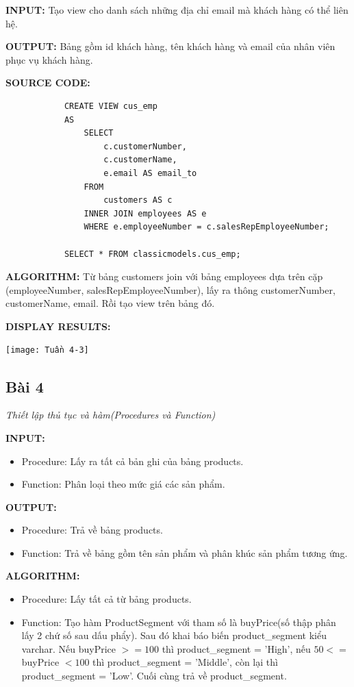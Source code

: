 \documentclass[12pt,a4paper]{report}
\begin{document}
	{\bf INPUT:} Tạo view cho danh sách những địa chỉ email mà khách hàng có thể liên hệ.
	
	{\bf OUTPUT:} Bảng gồm id khách hàng, tên khách hàng và email của nhân viên phục vụ khách hàng.
	
	{\bf SOURCE CODE:}
		\begin{lstlisting}
			CREATE VIEW cus_emp
			AS
				SELECT
					c.customerNumber,
					c.customerName,
					e.email AS email_to
				FROM 
					customers AS c
				INNER JOIN employees AS e
    			WHERE e.employeeNumber = c.salesRepEmployeeNumber;
    
			SELECT * FROM classicmodels.cus_emp;
		\end{lstlisting}
		
	{\bf ALGORITHM:} Từ bảng customers join với bảng employees dựa trên cặp (employeeNumber, salesRepEmployeeNumber), lấy ra thông customerNumber, customerName, email. Rồi tạo view trên bảng đó.
		
	{\bf DISPLAY RESULTS:}
		\begin{center}
			\texttt{[image: Tuần 4-3]}
		\end{center}			
	
\subsection{Bài 4}
	\begin{center}
		{\it Thiết lập thủ tục và hàm(Procedures và Function)}
	\end{center}
	
	{\bf INPUT:}
		\begin{itemize}
			\item Procedure: Lấy ra tất cả bản ghi của bảng products.
			\item Function:	Phân loại theo mức giá các sản phẩm.
		\end{itemize}

	{\bf OUTPUT:}
		\begin{itemize}
			\item Procedure: Trả về bảng products.
			\item Function: Trả về bảng gồm tên sản phẩm và phân khúc sản phẩm tương ứng.
		\end{itemize}


	{\bf ALGORITHM:}
		\begin{itemize}
			\item Procedure: Lấy tất cả từ bảng products.
			\item Function: Tạo hàm ProductSegment với tham số là buyPrice(số thập phân lấy 2 chứ số sau dấu phẩy). Sau đó khai báo biến product\_segment kiểu varchar. Nếu buyPrice $>= 100$ thì product\_segment = 'High', nếu $50 <=$ buyPrice $< 100$ thì product\_segment = 'Middle', còn lại thì product\_segment = 'Low'. Cuối cùng trả về product\_segment.
		\end{itemize}
	
\end{document}
